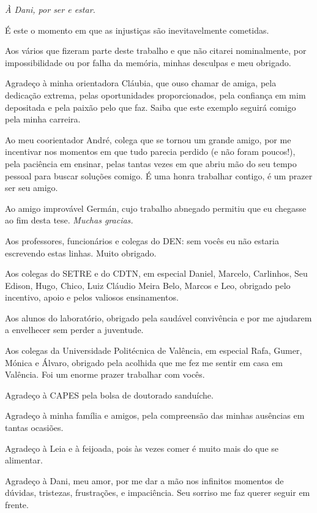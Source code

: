 \documentclass[12pt,openright,twoside,a4paper,english,french,spanish,brazil]{abntex2}
\begin{document}
\begin{dedicatoria}
   \vspace*{\fill}
   \centering
   \noindent
    \textit{ À Dani, por ser e estar.}\vspace*{\fill}
\end{dedicatoria}

\begin{agradecimentos}

  É este o momento em que as injustiças são inevitavelmente cometidas.

  Aos vários que fizeram parte deste trabalho e que não citarei nominalmente,
  por impossibilidade ou por falha da memória, minhas desculpas e meu obrigado.

  Agradeço à minha orientadora Cláubia, que ouso chamar de amiga, pela dedicação extrema,
  pelas oportunidades proporcionados, pela confiança em mim depositada e pela paixão pelo que faz.
  Saiba que este exemplo seguirá comigo pela minha carreira.

  Ao meu coorientador André, colega que se tornou um grande amigo, por me incentivar
  nos momentos em que tudo parecia perdido (e não foram poucos!), pela paciência em ensinar, pelas
  tantas vezes em que abriu mão do seu tempo pessoal para buscar soluções comigo. É uma honra
  trabalhar contigo, é um prazer ser seu amigo.

  Ao amigo improvável Germán, cujo trabalho abnegado permitiu que eu chegasse ao fim desta tese.
  \textit{Muchas gracias.}
  
  Aos professores, funcionários e colegas do DEN: sem vocês eu não estaria escrevendo estas linhas.
  Muito obrigado.

  Aos colegas do SETRE e do CDTN, em especial Daniel, Marcelo, Carlinhos, Seu Edison, Hugo, Chico, Luiz Cláudio
  Meira Belo, Marcos e Leo, obrigado pelo incentivo, apoio e pelos valiosos ensinamentos.

  Aos alunos do laboratório, obrigado pela saudável convivência e por me ajudarem a envelhecer sem
  perder a juventude.

  Aos colegas da Universidade Politécnica de Valência, em especial Rafa, Gumer, Mónica e Álvaro,
  obrigado pela acolhida que me fez me sentir em casa em Valência. Foi um enorme prazer trabalhar com
  vocês.

  Agradeço à CAPES pela bolsa de doutorado sanduíche.

  Agradeço à minha família e amigos, pela compreensão das minhas ausências em tantas ocasiões.

  Agradeço à Leia e à feijoada, pois às vezes comer é muito mais do que se alimentar.

  Agradeço à Dani, meu amor, por me dar a mão nos infinitos momentos de dúvidas, tristezas, frustrações,
  e impaciência. Seu sorriso me faz querer seguir em frente. 

  
\end{agradecimentos}
\end{document}
